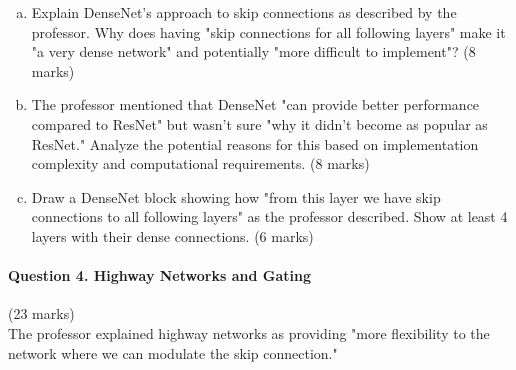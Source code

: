 \documentclass[12pt]{article}
\newcommand{\mediumanswer}{\vspace{3cm}}
\begin{document}
\begin{enumerate}[(a)]
    \item Explain DenseNet's approach to skip connections as described by the professor. Why does having "skip connections for all following layers" make it "a very dense network" and potentially "more difficult to implement"? \hfill (8 marks)
    
    \mediumanswer
    
    \item The professor mentioned that DenseNet "can provide better performance compared to ResNet" but wasn't sure "why it didn't become as popular as ResNet." Analyze the potential reasons for this based on implementation complexity and computational requirements. \hfill (8 marks)
    
    \mediumanswer
    
    \item Draw a DenseNet block showing how "from this layer we have skip connections to all following layers" as the professor described. Show at least 4 layers with their dense connections. \hfill (6 marks)
    
    \begin{center}
    \end{center}
\end{enumerate}

\newpage
\paragraph{Question 4. Highway Networks and Gating}{\hfill (23 marks)}\\
The professor explained highway networks as providing "more flexibility to the network where we can modulate the skip connection."
\end{document}
